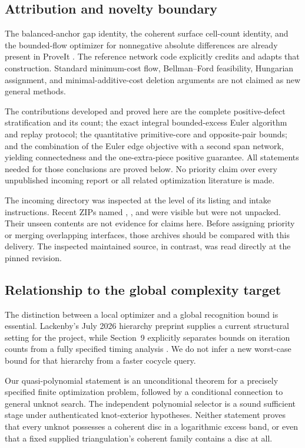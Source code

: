 \documentclass[11pt,letterpaper]{article}
\theoremstyle{definition}
\begin{document}
\subsection{Attribution and novelty boundary}
The balanced-anchor gap identity, the coherent surface cell-count identity, and the bounded-flow optimizer for nonnegative absolute differences are already present in ProveIt \cite{face,euler,flowcode}. The reference network code explicitly credits and adapts that construction. Standard minimum-cost flow, Bellman--Ford feasibility, Hungarian assignment, and minimal-additive-cost deletion arguments are not claimed as new general methods.

The contributions developed and proved here are the complete positive-defect stratification and its count; the exact integral bounded-excess Euler algorithm and replay protocol; the quantitative primitive-core and opposite-pair bounds; and the combination of the Euler edge objective with a second span network, yielding connectedness and the one-extra-piece positive guarantee. All statements needed for those conclusions are proved below. No priority claim over every unpublished incoming report or all related optimization literature is made.

The incoming directory was inspected at the level of its listing and intake instructions. Recent ZIPs named , , and  were visible but were not unpacked. Their unseen contents are not evidence for claims here. Before assigning priority or merging overlapping interfaces, those archives should be compared with this delivery. The inspected maintained source, in contrast, was read directly at the pinned revision.

\subsection{Relationship to the global complexity target}
The distinction between a local optimizer and a global recognition bound is essential. Lackenby's July 2026 hierarchy preprint supplies a current structural setting for the project, while Section~9 explicitly separates bounds on iteration counts from a fully specified timing analysis \cite{lackenby}. We do not infer a new worst-case bound for that hierarchy from a faster cocycle query.

Our quasi-polynomial statement is an unconditional theorem for a precisely specified finite optimization problem, followed by a conditional connection to general unknot search. The independent polynomial selector is a sound sufficient stage under authenticated knot-exterior hypotheses. Neither statement proves that every unknot possesses a coherent disc in a logarithmic excess band, or even that a fixed supplied triangulation's coherent family contains a disc at all.
\end{document}
